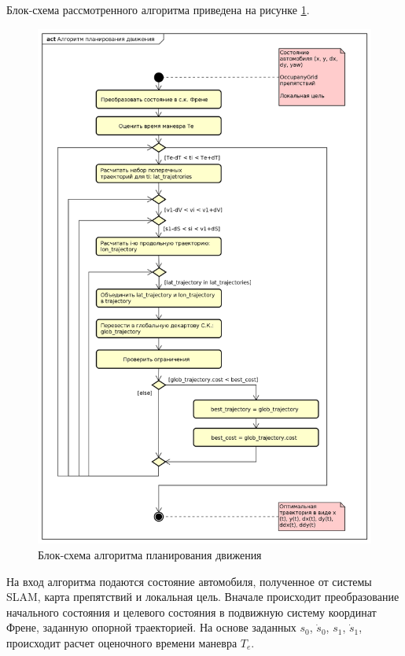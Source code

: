 Блок-схема рассмотренного алгоритма приведена на рисунке \ref{img:alg_quntic_planning_1}.

\begin{figure}[p]
      \centering
      \includegraphics[height=0.95\textheight]{images/alg_quntic_planning_1}
      \caption{Блок-схема алгоритма планирования движения}
      \label{img:alg_quntic_planning_1}
\end{figure}

На вход алгоритма подаются состояние автомобиля, полученное от системы SLAM, карта препятствий и локальная цель.
Вначале происходит преобразование начального состояния и целевого состояния в подвижную систему координат Френе,
заданную опорной траекторией. На основе заданных $s_0$, $\dot{s}_0$, $s_1$, $\dot{s}_1$, происходит расчет оценочного
времени маневра $T_e$.

